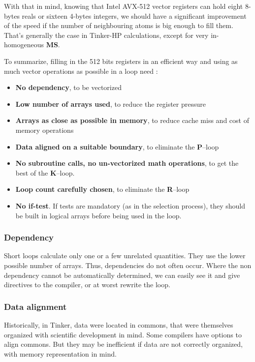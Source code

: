 \documentclass[9pt,comparison]{livecoms}
\begin{document}
With that in mind, knowing that Intel AVX-512 vector registers can hold eight 8-bytes reals or sixteen 4-bytes integers, we should have a significant improvement of the speed if the number of neighbouring atoms is big enough to fill them. That's generally the case in Tinker-HP calculations, except for very in-homogeneous \textbf{MS}.

To summarize, filling in the 512 bits registers in an efficient way and using as much vector operations as possible in a loop need :
\begin{itemize}
    \item \textbf{No dependency}, to be vectorized
    \item \textbf{Low number of arrays used}, to reduce the register pressure
    \item \textbf{Arrays as close as possible in memory}, to reduce cache miss and cost of memory operations
    \item \textbf{Data aligned on a suitable boundary}, to eliminate the \textbf{P}--loop
    \item \textbf{No subroutine calls, no un-vectorized math operations}, to get the best of the \textbf{K}--loop.
    \item \textbf{Loop count carefully chosen}, to eliminate the \textbf{R}--loop
    \item \textbf{No if-test}. If tests are mandatory (as in the selection process), they should be built in logical arrays before being used in the loop.
\end{itemize}
\subsubsection{Dependency}
\hspace{\parindent}Short loops calculate only one or a few unrelated quantities. They use the lower possible number of arrays. Thus, dependencies do not often occur. Where the non dependency cannot be automatically determined, we can easily see it and give directives to the compiler, or at worst rewrite the loop. 

\subsubsection{Data alignment}
\hspace{\parindent}Historically, in Tinker, data were located in commons, that were themselves organized with scientific development in mind. Some compilers have options to align commons. But they may be inefficient if data are not correctly organized, with memory representation in mind.
\end{document}
